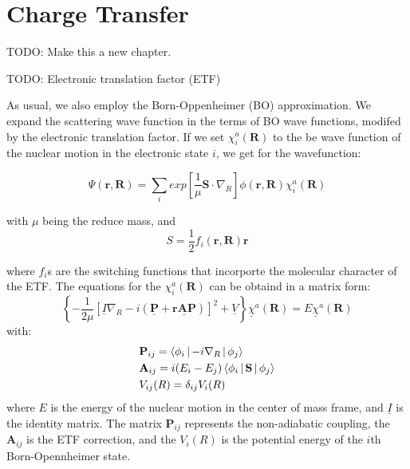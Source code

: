 \section{Charge Transfer}

TODO: Make this a new chapter.

TODO: Electronic translation factor (ETF) 

As usual, we also employ the Born-Oppenheimer (BO) approximation. We expand the scattering wave function in the terms of BO wave functions, modifed by the electronic translation factor. 
If we set $ \chi_i^a(\mathbf{R}) $ to the be wave function of the nuclear motion in the electronic state $ i $, we get for the wavefunction:

\begin{equation}
\Psi(\mathbf{r},\mathbf{R}) = \sum_i{exp\left[\frac{1}{\mu}\mathbf{S}\cdot\nabla_R \right]\phi(\mathbf{r},\mathbf{R}) }\chi_i^a(\mathbf{R})
\end{equation}

with $ \mu $ being the reduce mass, and 
\begin{equation}
S = \frac{1}{2}f_i(\mathbf{r},\mathbf{R})\mathbf{r}
\end{equation}

where $ f_i $s are the switching functions that incorporte the molecular character of the ETF.
The equations for the $ \chi_i^a(\mathbf{R}) $ can be obtaind in a matrix form:
\begin{equation}
\left\{-\frac{1}{2\mu}\left[\underline{I}\nabla_R - i(\underline{\mathbf{P}} + \underline{\mathbf{rAP}})\right]^2 + \underline{V}\right\}\underline{\chi}^a(\mathbf{R}) = E\underline{\chi}^a(\mathbf{R})
\end{equation}
with:
\begin{equation}\label{matrixFactors}
\begin{split}
& \mathbf{P}_{ij} = \Braket{\phi_i | -i\nabla_R | \phi_j} \\*
& \mathbf{A}_{ij} = i(E_i - E_j)\Braket{\phi_i | \mathbf{S} | \phi_j} \\*
& V_{ij}(R) = \delta_{ij}V_i(R)
\end{split}
\end{equation}
where $ E $ is the energy of the nuclear motion in the center of mass frame, and $ \underline{I} $ is the identity matrix. The matrix $ \mathbf{P}_{ij} $ represents the non-adiabatic coupling, the $ \mathbf{A}_{ij} $ is the ETF correction, and the $ V_i(R) $ is the potential energy of the $ i $th Born-Opennheimer state.

